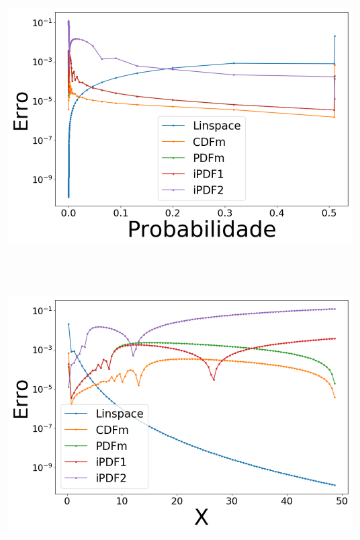 \begin{figure}[H]
	\centering
	\begin{subfigure}[b]{0.45\textwidth}
		\centering 
		\includegraphics[width=\textwidth]{./figuras/error_lognormal_linear_Probabilidade_1}
		\caption{}
		\label{fig:error_log_lin_prob}
	\end{subfigure}
	\hfill
	~ %
	\begin{subfigure}[b]{0.45\textwidth}
		\centering 
		\includegraphics[width=\textwidth]{./figuras/error_lognormal_linear_X_1}
		\caption{}
		\label{fig:error_log_lin_x}
	\end{subfigure}
	~ %

\end{figure}
